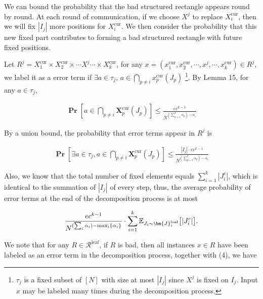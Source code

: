 \documentclass[10pt,a4paper]{article}
\begin{document}
We can bound the probability that the bad structured rectangle appears round by round. At each round of communication, if we choose $X^{j}$ to replace $X_{i}^{\text{cur}}$, then we will fix $|I_{j}|$ more positions for $X_{i}^{\text{cur}}$. We then consider the probability that this new fixed part contributes to forming a bad structured rectangle with future fixed positions.\par




Let $R^{j}=X_{1}^{\text{cur}}\times X_{2}^{\text{cur}}\times\cdots X^{j}\cdots\times X_{k}^{\text{cur}}$, for any $x=(x_{1}^{\text{cur}},x_{2}^{\text{cur}},\cdots,x^{j},\cdots,x_{k}^{\text{cur}})\in R^{j}$, we label it as a error term if $\exists a\in\tau_{j}$, $a\in\bigcap_{p\neq i}x_{p}^{\text{cur}}(J_{p})$ \footnote{ $\tau_{j}$ is a fixed subset of $[N]$ with size at most $|I_{j}|$ since $X^{j}$ is fixed on $I_{j}$. Input $x$ may be labeled many times during the decomposition process.}. By Lemma 15, for any $a\in\tau_{j}$,\par


\[\begin{gathered}
\operatorname*{\mathbf{Pr}}[a\in\bigcap_{p\neq i}\bm{X}_{p}^{\text{cur}}(J_{p})]\leq\frac{ec^{k-1}}{N^{(\sum_{p=1}^{k}\alpha_{p})-\alpha_{i}}}
\end{gathered}\]


By a union bound, the probability that error terms appear in $R^{j}$ is\par


\[\begin{gathered}
\operatorname*{\mathbf{Pr}}[\exists a\in\tau_{j},a\in\bigcap_{p\neq i}\bm{X}_{p}^{\text{cur}}(J_{p})]\leq\frac{|I_{j}|\cdot ec^{k-1}}{N^{(\sum_{p=1}^{k}\alpha_{p})-\alpha_{i}}}
\end{gathered}\]


Also, we know that the total number of fixed elements equals $\sum_{i=1}^{k}|J_{i}^{c}|$, which is identical to the summation of $|I_{j}|$ of every step, thus, the average probability of error terms at the end of the decomposition process is at most\par


\[\begin{gathered}
\frac{ec^{k-1}}{N^{(\sum_{i}\alpha_{i})-\mathop{\max}_{i}\{\alpha_{i}\}}}\cdot\sum_{i=1}^{k}\mathbb{E}_{J_{i}\sim\bm{J}_{i}^{\text{leaf}}}\big{[}|J_{i}^{c}|\big{]}.
\end{gathered}\]


We note that for any $R\in\mathcal{R}^{\text{leaf}}$, if $R$ is bad, then all instances $x\in R$ have been labeled as an error term in the decomposition process, together with (4), we have\par
\end{document}
